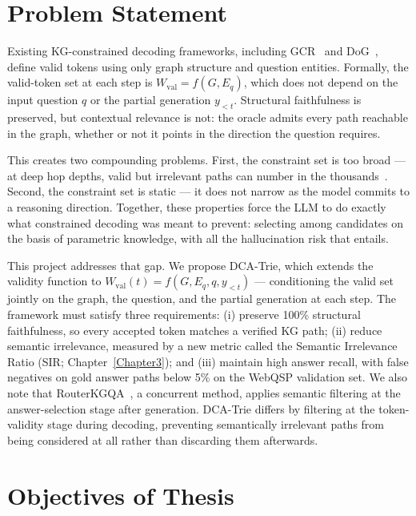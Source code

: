 \section{Problem Statement}

Existing KG-constrained decoding frameworks, including GCR~\citep{luo2025-graph-constrained-reasoning} and DoG~\citep{li2024-decoding-on-graphs}, define valid tokens using only graph structure and question entities. Formally, the valid-token set at each step is $W_{\mathrm{val}} = f(G, E_q)$, which does not depend on the input question $q$ or the partial generation $y_{<t}$. Structural faithfulness is preserved, but contextual relevance is not: the oracle admits every path reachable in the graph, whether or not it points in the direction the question requires.

This creates two compounding problems. First, the constraint set is too broad — at deep hop depths, valid but irrelevant paths can number in the thousands~\citep{he2021improving,talmor2018cwq}. Second, the constraint set is static — it does not narrow as the model commits to a reasoning direction. Together, these properties force the LLM to do exactly what constrained decoding was meant to prevent: selecting among candidates on the basis of parametric knowledge, with all the hallucination risk that entails.

This project addresses that gap. We propose DCA-Trie, which extends the validity function to $W_{\mathrm{val}}(t) = f(G, E_q, q, y_{<t})$ — conditioning the valid set jointly on the graph, the question, and the partial generation at each step. The framework must satisfy three requirements: (i) preserve 100\% structural faithfulness, so every accepted token matches a verified KG path; (ii) reduce semantic irrelevance, measured by a new metric called the Semantic Irrelevance Ratio (SIR; Chapter~\ref{Chapter3}); and (iii) maintain high answer recall, with false negatives on gold answer paths below 5\% on the WebQSP validation set. We also note that RouterKGQA~\citep{yuan2026routerkgqa}, a concurrent method, applies semantic filtering at the answer-selection stage after generation. DCA-Trie differs by filtering at the token-validity stage during decoding, preventing semantically irrelevant paths from being considered at all rather than discarding them afterwards.

\section{Objectives of Thesis}

